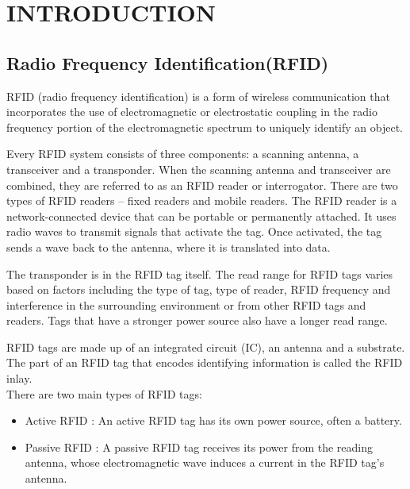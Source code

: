 \chapter{INTRODUCTION}
\thispagestyle{empty}
\onehalfspacing
\pagestyle{fancy}
\fancyhf{}
\fancyhead[LE,RO]{\textit{\footnotesize \thepage}}
 
\renewcommand{\headrulewidth}{2pt}
\renewcommand{\footrulewidth}{1pt}
\section{Radio Frequency Identification(RFID)}
\par RFID (radio frequency identification) is a form of wireless communication that incorporates the use of electromagnetic or electrostatic coupling in the radio frequency portion of the electromagnetic spectrum to uniquely identify an object.
\par Every RFID system consists of three components: a scanning antenna, a transceiver and a transponder. When the scanning antenna and transceiver are combined, they are referred to as an RFID reader or interrogator. There are two types of RFID readers -- fixed readers and mobile readers. The RFID reader is a network-connected device that can be portable or permanently attached. It uses radio waves to transmit signals that activate the tag. Once activated, the tag sends a wave back to the antenna, where it is translated into data.
\par The transponder is in the RFID tag itself. The read range for RFID tags varies based on factors including the type of tag, type of reader, RFID frequency and interference in the surrounding environment or from other RFID tags and readers. Tags that have a stronger power source also have a longer read range.
\par RFID tags are made up of an integrated circuit (IC), an antenna and a substrate. The part of an RFID tag that encodes identifying information is called the RFID inlay.
\\
There are two main types of RFID tags:
\begin{itemize}
    \item Active RFID : An active RFID tag has its own power source, often a battery.
    \item Passive RFID : A passive RFID tag receives its power from the reading antenna, whose electromagnetic wave induces a current in the RFID tag's antenna.
\end{itemize}

